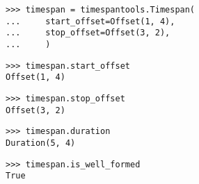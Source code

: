 \begin{singlespacing}
\begin{lstlisting}
>>> timespan = timespantools.Timespan(
...     start_offset=Offset(1, 4),
...     stop_offset=Offset(3, 2),
...     )
\end{lstlisting}
\end{singlespacing}

\begin{comment}
<abjad>
timespan.start_offset
</abjad>
\end{comment}

\begin{singlespacing}
\begin{lstlisting}
>>> timespan.start_offset
Offset(1, 4)
\end{lstlisting}
\end{singlespacing}

\begin{comment}
<abjad>
timespan.stop_offset
</abjad>
\end{comment}

\begin{singlespacing}
\begin{lstlisting}
>>> timespan.stop_offset
Offset(3, 2)
\end{lstlisting}
\end{singlespacing}

\begin{comment}
<abjad>
timespan.duration
</abjad>
\end{comment}

\begin{singlespacing}
\begin{lstlisting}
>>> timespan.duration
Duration(5, 4)
\end{lstlisting}
\end{singlespacing}

\begin{comment}
<abjad>
timespan.is_well_formed
</abjad>
\end{comment}

\begin{singlespacing}
\begin{lstlisting}
>>> timespan.is_well_formed
True
\end{lstlisting}
\end{singlespacing}


